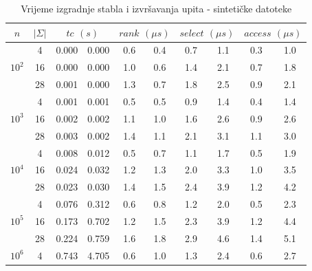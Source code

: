 \documentclass[times, utf8, seminar, numeric]{fer}
\begin{document}
\begin{table}[h]
\caption{Vrijeme izgradnje stabla i izvršavanja upita - sintetičke datoteke}
\centering
  \begin{tabular}{c|c|c|c|c|c|c|c|c|c}
    $n$ & $|\Sigma|$ & \multicolumn{2}{c|}{$tc$ $(s)$} &
    \multicolumn{2}{c|}{$rank$ $(\mu s)$} & \multicolumn{2}{c|}{$select$ $(\mu s)$} & \multicolumn{2}{c}{$access$ $(\mu s)$}\\ \hline
    \multirow{3}{*}{$10^2$}
      & \num{4} & \num{0.000} & \num{0.000} & \num{0.6} & \num{0.4} & \num{0.7} & \num{1.1} & \num{0.3} & \num{1.0} \\
      & \num{16} & \num{0.000} & \num{0.000} & \num{1.0} & \num{0.6} & \num{1.4} & \num{2.1} & \num{0.7} & \num{1.8} \\
      & \num{28} & \num{0.001} & \num{0.000} & \num{1.3} & \num{0.7} & \num{1.8} & \num{2.5} & \num{0.9} & \num{2.1} \\
    \hline
    \multirow{3}{*}{$10^3$}
      & \num{4} & \num{0.001} & \num{0.001} & \num{0.5} & \num{0.5} & \num{0.9} & \num{1.4} & \num{0.4} & \num{1.4} \\
      & \num{16} & \num{0.002} & \num{0.002} & \num{1.1} & \num{1.0} & \num{1.6} & \num{2.6} & \num{0.9} & \num{2.6} \\
      & \num{28} & \num{0.003} & \num{0.002} & \num{1.4} & \num{1.1} & \num{2.1} & \num{3.1} & \num{1.1} & \num{3.0} \\
    \hline
    \multirow{3}{*}{$10^4$}
      & \num{4} & \num{0.008} & \num{0.012} & \num{0.5} & \num{0.7} & \num{1.1} & \num{1.7} & \num{0.5} & \num{1.9} \\
      & \num{16} & \num{0.024} & \num{0.032} & \num{1.2} & \num{1.3} & \num{2.0} & \num{3.3} & \num{1.0} & \num{3.5} \\
      & \num{28} & \num{0.023} & \num{0.030} & \num{1.4} & \num{1.5} & \num{2.4} & \num{3.9} & \num{1.2} & \num{4.2} \\
    \hline
    \multirow{3}{*}{$10^5$}
      & \num{4} & \num{0.076} & \num{0.312} & \num{0.6} & \num{0.8} & \num{1.2} & \num{2.0} & \num{0.5} & \num{2.3} \\
      & \num{16} & \num{0.173} & \num{0.702} & \num{1.2} & \num{1.5} & \num{2.3} & \num{3.9} & \num{1.2} & \num{4.4} \\
      & \num{28} & \num{0.224} & \num{0.759} & \num{1.6} & \num{1.8} & \num{2.9} & \num{4.6} & \num{1.4} & \num{5.1} \\
    \hline
    \multirow{3}{*}{$10^6$}
      & \num{4} & \num{0.743} & \num{4.705} & \num{0.6} & \num{1.0} & \num{1.3} & \num{2.4} & \num{0.6} & \num{2.7} \\

\end{tabular}
\end{table}
\end{document}
